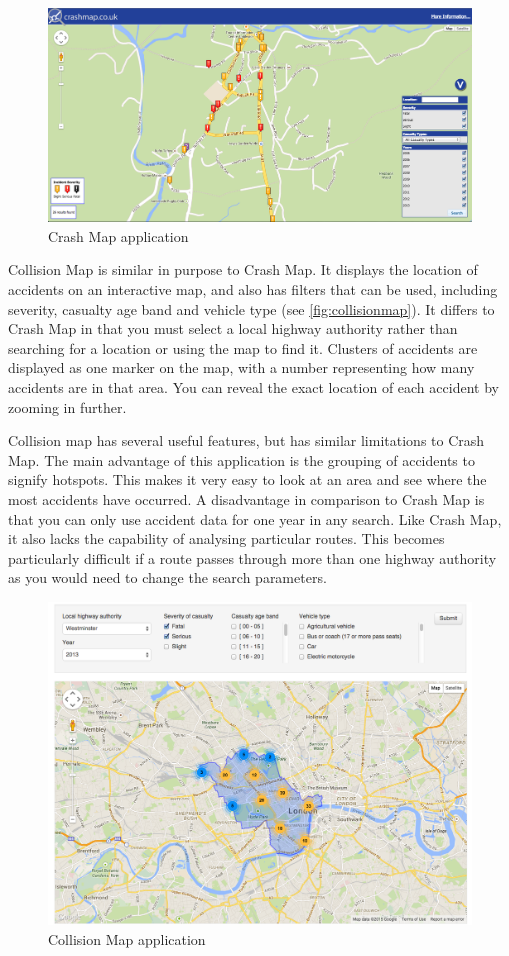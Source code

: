 \documentclass[authoryearcitations]{UoYCSproject}
\begin{document}
\begin{figure}
	\includegraphics[scale=0.3]{crashmap}
	\caption{Crash Map application}
	\label{fig:crashmap}
\end{figure}

Collision Map \citep{DepartmentforTransport} is similar in purpose to Crash Map. It displays the location of accidents on an interactive map, and also has filters that can be used, including severity, casualty age band and vehicle type (see \autoref{fig:collisionmap}). It differs to Crash Map in that you must select a local highway authority rather than searching for a location or using the map to find it. Clusters of accidents are displayed as one marker on the map, with a number representing how many accidents are in that area. You can reveal the exact location of each accident by zooming in further.

Collision map has several useful features, but has similar limitations to Crash Map. The main advantage of this application is the grouping of accidents to signify hotspots. This makes it very easy to look at an area and see where the most accidents have occurred. A disadvantage in comparison to Crash Map is that you can only use accident data for one year in any search. Like Crash Map, it also lacks the capability of analysing particular routes. This becomes particularly difficult if a route passes through more than one highway authority as you would need to change the search parameters. 

\begin{figure}
	\includegraphics[scale=0.3]{collisionmap}
	\caption{Collision Map application}
	\label{fig:collisionmap}
\end{figure}
\end{document}
